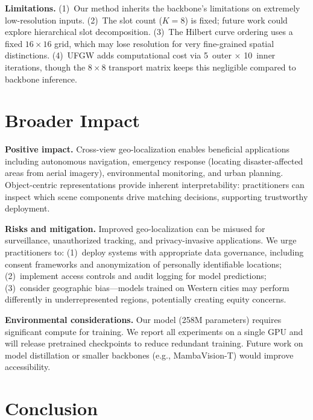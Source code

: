 \documentclass{article}
\begin{document}
\textbf{Limitations.}
(1)~Our method inherits the backbone's limitations on extremely low-resolution inputs. (2)~The slot count ($K=8$) is fixed; future work could explore hierarchical slot decomposition. (3)~The Hilbert curve ordering uses a fixed $16{\times}16$ grid, which may lose resolution for very fine-grained spatial distinctions. (4)~UFGW adds computational cost via 5~outer $\times$ 10~inner iterations, though the $8{\times}8$ transport matrix keeps this negligible compared to backbone inference.

\section{Broader Impact}\label{sec:impact}

\textbf{Positive impact.} Cross-view geo-localization enables beneficial applications including autonomous navigation, emergency response (locating disaster-affected areas from aerial imagery), environmental monitoring, and urban planning. Object-centric representations provide inherent interpretability: practitioners can inspect which scene components drive matching decisions, supporting trustworthy deployment.

\textbf{Risks and mitigation.} Improved geo-localization can be misused for surveillance, unauthorized tracking, and privacy-invasive applications. We urge practitioners to: (1)~deploy systems with appropriate data governance, including consent frameworks and anonymization of personally identifiable locations; (2)~implement access controls and audit logging for model predictions; (3)~consider geographic bias---models trained on Western cities may perform differently in underrepresented regions, potentially creating equity concerns.

\textbf{Environmental considerations.} Our model (258M parameters) requires significant compute for training. We report all experiments on a single GPU and will release pretrained checkpoints to reduce redundant training. Future work on model distillation or smaller backbones (e.g., MambaVision-T) would improve accessibility.

\section{Conclusion}\label{sec:conclusion}
\end{document}
